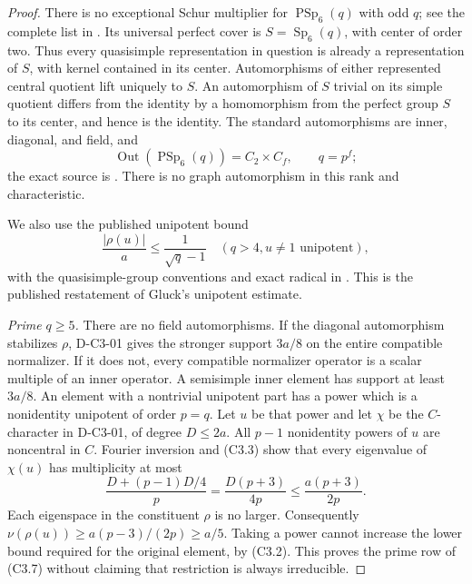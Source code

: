 \begin{proof}
There is no exceptional Schur multiplier for
$\operatorname{PSp}_6(q)$ with odd $q$; see the complete list in
\cite[Chapter~5, Table~1, p.~35]{BI:HHM}.
Its universal perfect cover is $S=\operatorname{Sp}_6(q)$, with
center of order two. Thus every quasisimple representation in
question is already a representation of $S$, with kernel contained
in its center. Automorphisms of either represented central quotient
lift uniquely to $S$. An automorphism of $S$ trivial on its simple
quotient differs from the identity by a homomorphism from the
perfect group $S$ to its center, and hence is the identity.
The standard automorphisms are inner, diagonal, and field, and
\[
 \operatorname{Out}(\operatorname{PSp}_6(q))=C_2\times C_f,
 \qquad q=p^f;
                                                               \tag{C3.8}
\]
the exact source is \cite[\S2.2.2 and Table~2.1,
author p.~14]{HES:LiXia2022}. There is no graph automorphism in
this rank and characteristic.

We also use the published unipotent bound
\[
 \frac{|\rho(u)|}{a}\le\frac1{\sqrt q-1}
 \quad(q>4, u\ne1\text{ unipotent}),
                                                               \tag{C3.9}
\]
with the quasisimple-group conventions and exact radical in
\cite[pp.~2--4, Theorem~2.4(i)]{HES:Liebeck2017}.
This is the published restatement of Gluck's unipotent estimate.

\emph{Prime $q\ge5$.}
There are no field automorphisms. If the diagonal automorphism
stabilizes $\rho$, D-C3-01 gives the stronger support $3a/8$
on the entire compatible normalizer. If it does not, every
compatible normalizer operator is a scalar multiple of an inner
operator. A semisimple inner element has support at least $3a/8$.
An element with a nontrivial unipotent part has a power which is a
nonidentity unipotent of order $p=q$. Let $u$ be that power and
let $\chi$ be the $C$-character in D-C3-01, of degree $D\le2a$.
All $p-1$ nonidentity powers of $u$ are noncentral in $C$.
Fourier inversion and (C3.3) show that every eigenvalue of
$\chi(u)$ has multiplicity at most
\[
 \frac{D+(p-1)D/4}{p}
       =\frac{D(p+3)}{4p}
       \le\frac{a(p+3)}{2p}.
                                                               \tag{C3.10}
\]
Each eigenspace in the constituent $\rho$ is no larger.
Consequently $\nu(\rho(u))\ge a(p-3)/(2p)\ge a/5$.
Taking a power cannot increase the lower bound required for the
original element, by (C3.2). This proves the prime row of (C3.7)
without claiming that restriction is always irreducible.


\end{proof}
